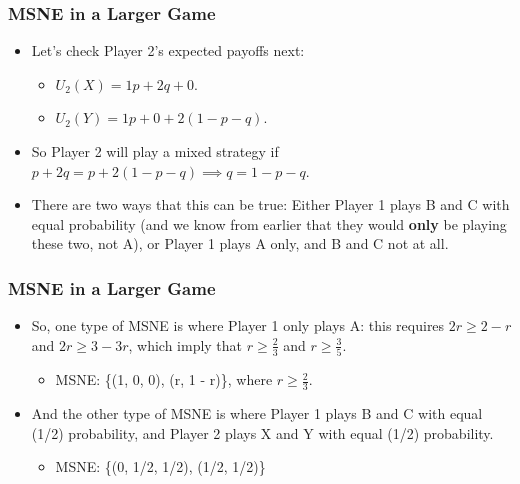 \begin{frame}
\frametitle{MSNE in a Larger Game}
\begin{itemize}
	\item Let's check Player 2's expected payoffs next:
	\begin{itemize}
		\item $U_2(X) = 1p + 2q + 0$.
		\item $U_2(Y) = 1p + 0 + 2(1 - p - q)$.
	\end{itemize}
	\item So Player 2 will play a mixed strategy if $p + 2q = p + 2(1 - p - q) \implies q = 1 - p - q$.
	\item There are two ways that this can be true: Either Player 1 plays B and C with equal probability (and we know from earlier that they would \textbf{only} be playing these two, not A), or Player 1 plays A only, and B and C not at all. 
\end{itemize}
\end{frame}

\begin{frame}
\frametitle{MSNE in a Larger Game}
\begin{itemize}
	\item So, one type of MSNE is where Player 1 only plays A: this requires $2r \geq 2 - r$ and $2r \geq 3 - 3r$, which imply that $r \geq \frac{2}{3}$ and $r \geq \frac{3}{5}$.
	\begin{itemize}
		\item MSNE: \{(1, 0, 0), (r, 1 - r)\}, where $r \geq \frac{2}{3}$.
	\end{itemize}
	\item And the other type of MSNE is where Player 1 plays B and C with equal (1/2) probability, and Player 2 plays X and Y with equal (1/2) probability.
	\begin{itemize}
		\item MSNE: \{(0, 1/2, 1/2), (1/2, 1/2)\}
	\end{itemize}
\end{itemize}
\end{frame}

